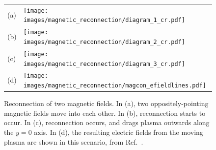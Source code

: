   \begin{figure}[ht]
    \centering
    \begin{tabular}{m{1cm}m{10cm}}
      (a) & \texttt{[image: images/magnetic\_reconnection/diagram\_1\_cr.pdf]} \\
      (b) & \texttt{[image: images/magnetic\_reconnection/diagram\_2\_cr.pdf]} \\
      (c) & \texttt{[image: images/magnetic\_reconnection/diagram\_3\_cr.pdf]} \\
      (d) & \texttt{[image: images/magnetic\_reconnection/magcon\_efieldlines.pdf]}
    \end{tabular}
    \caption[Magnetic Reconnection]{
      Reconnection of two magnetic fields.
      In (a), two oppositely-pointing magnetic fields move into each other.
      In (b), reconnection starts to occur.
      In (c), reconnection occurs, and drags plasma outwards along the $y=0$ axis.
      In (d), the resulting electric fields from the moving plasma are shown in this scenario, from Ref.~\cite{magcon_crab}.
    }
    \label{fig:magcon}
  \end{figure}
  
  
  \FloatBarrier
  
  
  
  

